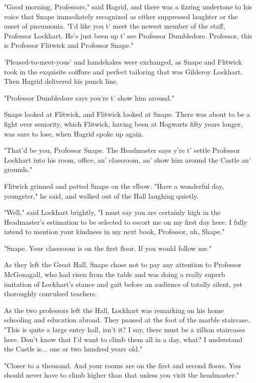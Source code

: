 \documentclass[a4paper,11pt]{article}
\begin{document}
"Good morning, Professors," said Hagrid, and there was a fizzing undertone to his voice that Snape immediately recognized as either suppressed laughter or the onset of pneumonia. "I'd like you t' meet the newest member of the staff, Professor Lockhart. He's just been up t' see Professor Dumbledore. Professor, this is Professor Flitwick and Professor Snape."

'Pleased-to-meet-yous' and handshakes were exchanged, as Snape and Flitwick took in the exquisite coiffure and perfect tailoring that was Gilderoy Lockhart. Then Hagrid delivered his punch line.

"Professor Dumbledore says you're t' show him around."

Snape looked at Flitwick, and Flitwick looked at Snape. There was about to be a fight over seniority, which Flitwick, having been at Hogwarts fifty years longer, was sure to lose, when Hagrid spoke up again.

"That'd be you, Professor Snape. The Headmaster says y're t' settle Professor Lockhart into his room, office, an' classroom, an' show him around the Castle an' grounds."

Flitwick grinned and patted Snape on the elbow. "Have a wonderful day, youngster," he said, and walked out of the Hall laughing quietly.

"Well," said Lockhart brightly, "I must say you are certainly high in the Headmaster's estimation to be selected to escort me on my first day here. I fully intend to mention your kindness in my next book, Professor, uh, Shape."

"Snape. Your classroom is on the first floor. If you would follow me."

As they left the Great Hall, Snape chose not to pay any attention to Professor McGonagall, who had risen from the table and was doing a really superb imitation of Lockhart's stance and gait before an audience of totally silent, yet thoroughly convulsed teachers.

As the two professors left the Hall, Lockhart was remarking on his home schooling and education abroad. They paused at the foot of the marble staircase. "This is quite a large entry hall, isn't it? I say, there must be a zillion staircases here. Don't know that I'd want to climb them all in a day, what? I understand the Castle is... one or two hundred years old."

"Closer to a thousand. And your rooms are on the first and second floors. You should never have to climb higher than that unless you visit the headmaster."
\end{document}
